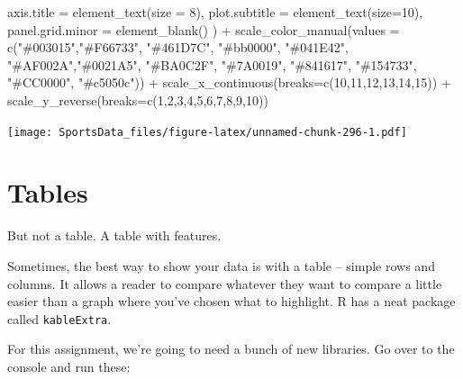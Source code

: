 \documentclass[
]{book}
\newenvironment{Shaded}{\begin{snugshade}}{\end{snugshade}}
\newcommand{\AttributeTok}[1]{\textcolor[rgb]{0.77,0.63,0.00}{#1}}
\newcommand{\DecValTok}[1]{\textcolor[rgb]{0.00,0.00,0.81}{#1}}
\newcommand{\FunctionTok}[1]{\textcolor[rgb]{0.00,0.00,0.00}{#1}}
\newcommand{\NormalTok}[1]{#1}
\newcommand{\SpecialCharTok}[1]{\textcolor[rgb]{0.00,0.00,0.00}{#1}}
\newcommand{\StringTok}[1]{\textcolor[rgb]{0.31,0.60,0.02}{#1}}
\begin{document}
\begin{Shaded}
\begin{Highlighting}[]
    \AttributeTok{axis.title =} \FunctionTok{element\_text}\NormalTok{(}\AttributeTok{size =} \DecValTok{8}\NormalTok{), }
    \AttributeTok{plot.subtitle =} \FunctionTok{element\_text}\NormalTok{(}\AttributeTok{size=}\DecValTok{10}\NormalTok{), }
    \AttributeTok{panel.grid.minor =} \FunctionTok{element\_blank}\NormalTok{()}
\NormalTok{    ) }\SpecialCharTok{+}
  \FunctionTok{scale\_color\_manual}\NormalTok{(}\AttributeTok{values =} \FunctionTok{c}\NormalTok{(}\StringTok{"\#003015"}\NormalTok{,}\StringTok{"\#F66733"}\NormalTok{, }\StringTok{"\#461D7C"}\NormalTok{, }\StringTok{"\#bb0000"}\NormalTok{, }\StringTok{"\#041E42"}\NormalTok{, }\StringTok{"\#AF002A"}\NormalTok{,}\StringTok{"\#0021A5"}\NormalTok{, }\StringTok{"\#BA0C2F"}\NormalTok{, }\StringTok{"\#7A0019"}\NormalTok{, }\StringTok{"\#841617"}\NormalTok{, }\StringTok{"\#154733"}\NormalTok{, }\StringTok{"\#CC0000"}\NormalTok{, }\StringTok{"\#c5050c"}\NormalTok{)) }\SpecialCharTok{+}
  \FunctionTok{scale\_x\_continuous}\NormalTok{(}\AttributeTok{breaks=}\FunctionTok{c}\NormalTok{(}\DecValTok{10}\NormalTok{,}\DecValTok{11}\NormalTok{,}\DecValTok{12}\NormalTok{,}\DecValTok{13}\NormalTok{,}\DecValTok{14}\NormalTok{,}\DecValTok{15}\NormalTok{)) }\SpecialCharTok{+} 
  \FunctionTok{scale\_y\_reverse}\NormalTok{(}\AttributeTok{breaks=}\FunctionTok{c}\NormalTok{(}\DecValTok{1}\NormalTok{,}\DecValTok{2}\NormalTok{,}\DecValTok{3}\NormalTok{,}\DecValTok{4}\NormalTok{,}\DecValTok{5}\NormalTok{,}\DecValTok{6}\NormalTok{,}\DecValTok{7}\NormalTok{,}\DecValTok{8}\NormalTok{,}\DecValTok{9}\NormalTok{,}\DecValTok{10}\NormalTok{))}
\end{Highlighting}
\end{Shaded}

\texttt{[image: SportsData\_files/figure-latex/unnamed-chunk-296-1.pdf]}

\hypertarget{tables}{%
\chapter{Tables}\label{tables}}

But not a table. A table with features.

Sometimes, the best way to show your data is with a table -- simple rows and columns. It allows a reader to compare whatever they want to compare a little easier than a graph where you've chosen what to highlight. R has a neat package called \texttt{kableExtra}.

For this assignment, we're going to need a bunch of new libraries. Go over to the console and run these:
\end{document}
